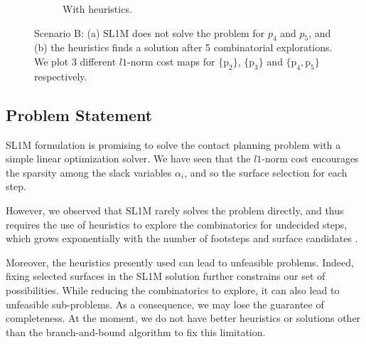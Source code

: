 \begin{figure}[h!]
\begin{subfigure}[t]{0.9\linewidth}
        \caption{With heuristics.}
        \label{fig:sl1m:final:1}
    \end{subfigure}
    \caption{Scenario B: (a) SL1M does not solve the problem for $p_4$ and $p_5$, and (b) the heuristics finds a solution after 5 combinatorial explorations. We plot 3 different $l1$-norm cost maps for $\{\mbox{p}_2\}$, $\{\mbox{p}_3\}$ and $\{\mbox{p}_4,\mbox{p}_5\}$ respectively.}
    \label{fig:sl1m:final}
\end{figure}

\subsection{Problem Statement}
SL1M formulation is promising to solve the contact planning problem with a simple linear optimization solver.
We have seen that the $l1$-norm cost encourages the sparsity among the slack variables $\alpha_i$, and so the surface selection for each step.


However, we observed that SL1M rarely solves the problem directly, and thus requires the use of heuristics to explore the combinatorics for undecided steps, which grows exponentially with the number of footsteps and surface candidates \cite{sl1m_v1}.

Moreover, the heuristics presently used can lead to unfeasible problems. 
Indeed, fixing selected surfaces in the SL1M solution further constrains our set of possibilities. While reducing the combinatorics to explore, it can also lead to unfeasible sub-problems. As a consequence, we may lose the guarantee of completeness.
At the moment, we do not have better heuristics or solutions other than the branch-and-bound algorithm to fix this limitation.

